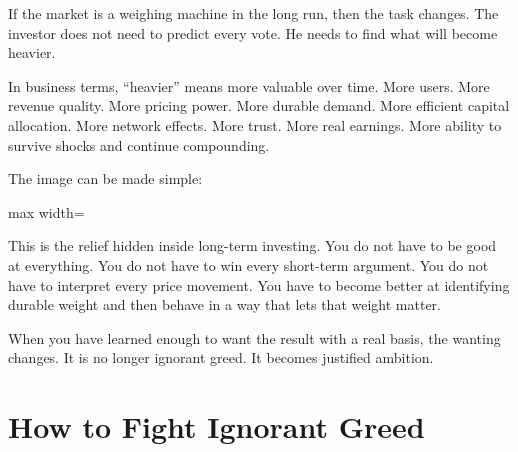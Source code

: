If the market is a weighing machine in the long run, then the task changes. The investor does not need to predict every vote. He needs to find what will become heavier.

In business terms, ``heavier'' means more valuable over time. More users. More revenue quality. More pricing power. More durable demand. More efficient capital allocation. More network effects. More trust. More real earnings. More ability to survive shocks and continue compounding.

The image can be made simple:

\begin{center}
\begin{adjustbox}{max width=\linewidth}
\end{adjustbox}
\end{center}

This is the relief hidden inside long-term investing. You do not have to be good at everything. You do not have to win every short-term argument. You do not have to interpret every price movement. You have to become better at identifying durable weight and then behave in a way that lets that weight matter.

When you have learned enough to want the result with a real basis, the wanting changes. It is no longer ignorant greed. It becomes justified ambition.

\section*{How to Fight Ignorant Greed}

